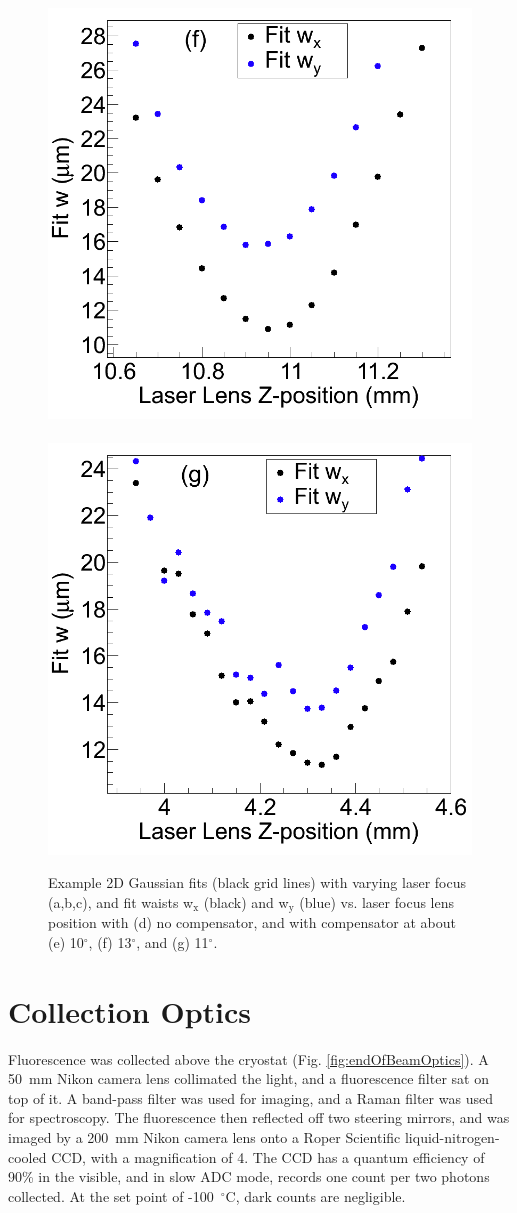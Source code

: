\begin{figure}
                \includegraphics[width=.45\textwidth]{figures/astigcorr_curve_corr_13deg.png}
                ~
                \includegraphics[width=.45\textwidth]{figures/astigcorr_curve_corr_9-16.png}
                \caption{Example 2D Gaussian fits (black grid lines) with varying laser focus (a,b,c), and fit waists  w$_{\text{x}}$ (black) and  w$_{\text{y}}$ (blue) vs. laser focus lens position with (d) no compensator, and with compensator at about (e) 10$^{\circ}$, (f) 13$^{\circ}$, and (g) 11$^{\circ}$.}
\label{fig:astig}
\end{figure}



\section{Collection Optics}
\label{sec:collection}

Fluorescence was collected above the cryostat (Fig. \ref{fig:endOfBeamOptics}).  A 50~mm Nikon camera lens collimated the light, and a fluorescence filter sat on top of it.  A band-pass filter was used for imaging, and a Raman filter was used for spectroscopy.  The fluorescence then reflected off two steering mirrors, and was imaged by a 200~mm Nikon camera lens onto a Roper Scientific liquid-nitrogen-cooled CCD, with a magnification of 4.  The CCD has a quantum efficiency of 90\% in the visible, and in slow ADC mode, records one count per two photons collected.  At the set point of -100~$^{\circ}$C, dark counts are negligible.

